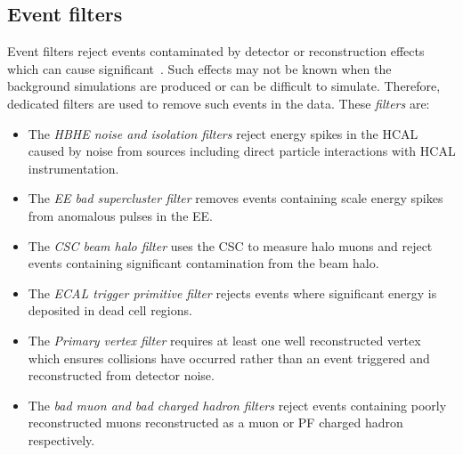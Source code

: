 \subsection{Event filters}
\label{sec:event_filters}
Event filters reject events contaminated by detector or reconstruction effects
which can cause significant~\met. Such effects may not be known when the 
background simulations are produced or can be difficult to simulate. Therefore,
dedicated filters are used to remove such events in the data. These \met \emph{filters} 
are:

\begin{itemize}
\item The \emph{HBHE noise and isolation filters} reject energy spikes in the HCAL caused by noise from sources 
including direct particle interactions with HCAL instrumentation.
\item The \emph{EE bad supercluster filter} removes events containing \TeV scale energy spikes from anomalous
pulses in the EE.
\item The \emph{CSC beam halo filter} uses the CSC to measure halo muons and reject events containing 
significant contamination from the beam halo.
\item The \emph{ECAL trigger primitive filter} rejects events where significant energy is deposited in dead cell regions.
\item The \emph{Primary vertex filter} requires at least one well reconstructed vertex which ensures collisions have occurred
rather than an event triggered and reconstructed from detector noise.
\item The \emph{bad muon and bad charged hadron filters} reject events containing poorly reconstructed muons reconstructed as 
a muon or PF charged hadron respectively.
\end{itemize}


